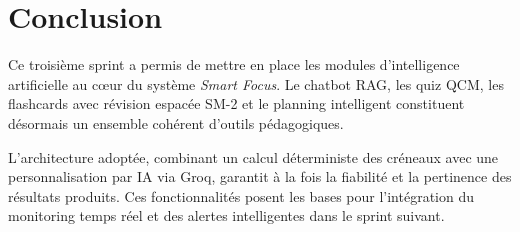 
\section{Conclusion}

Ce troisième sprint a permis de mettre en place les modules d'intelligence artificielle au cœur du système \textit{Smart Focus}. Le chatbot RAG, les quiz QCM, les flashcards avec révision espacée SM-2 et le planning intelligent constituent désormais un ensemble cohérent d'outils pédagogiques.

L'architecture adoptée, combinant un calcul déterministe des créneaux avec une personnalisation par IA via Groq, garantit à la fois la fiabilité et la pertinence des résultats produits. Ces fonctionnalités posent les bases pour l'intégration du monitoring temps réel et des alertes intelligentes dans le sprint suivant.
